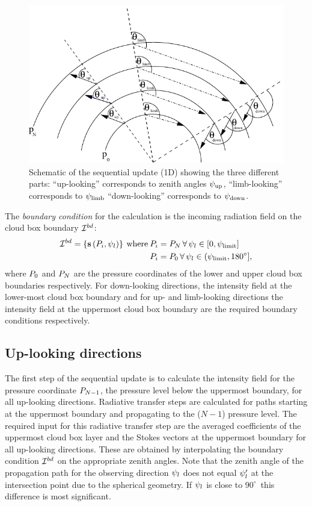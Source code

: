 \begin{figure}[htbp]
\centering
  \includegraphics[width=.8\hsize]{seq_update_bw}
 \caption{Schematic of the sequential update (1D) showing the three different parts:  ``up-looking'' corresponds to zenith angles $\psi_\mathrm{up}$, ``limb-looking'' corresponds to $\psi_\mathrm{limb}$ ``down-looking'' corresponds to $\psi_\mathrm{down}$.}
  \label{fig:scattering:seq_update}  
\end{figure}

The \emph{boundary condition} for the calculation is the incoming
radiation field on the cloud box boundary ${\mathcal I}^{bd}$:
\begin{eqnarray}
  {\mathcal I}^{bd} = \left\{{\bf s} \left( P_i,\psi_l \right) \right\}
  \: \mathrm{where}  \: & P_i = P_N \, \forall \,  \psi_l \in [0,\psi_\mathrm{limit}]  \nonumber\\
   & P_i = P_0  \, \forall \, \psi_l \in (\psi_\mathrm{limit},180^\circ],
\end{eqnarray}
where $P_0$ and $P_N$ are the pressure coordinates of the lower and
upper cloud box boundaries respectively. For down-looking directions,
the intensity field at the lower-most cloud box boundary and for up-
and limb-looking directions the intensity field at the uppermost
cloud box boundary are the required boundary conditions respectively.

\subsection{Up-looking directions}

The first step of the sequential update is to calculate the intensity
field for the pressure coordinate $P_{N-1}$, the pressure level below
the uppermost boundary, for all up-looking directions.  Radiative
transfer steps are calculated for paths starting at the uppermost
boundary and propagating to the ($N-1$) pressure level. The required
input for this radiative transfer step are the averaged coefficients
of the uppermost cloud box layer and the Stokes vectors at
the uppermost boundary for all up-looking directions. These are obtained
by interpolating the boundary condition ${\mathcal I}^{bd}$ on the
appropriate zenith angles. Note that the zenith angle of the
propagation path for the observing direction $\psi_l$ does not equal
$\psi_l'$ at the intersection point due to the spherical
geometry. If $\psi_l$ is close to $90^\circ$\ this difference is
most significant.
  
